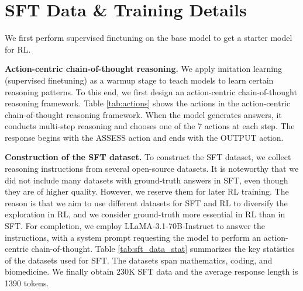 




\section{SFT Data \& Training Details}
\label{sec:sft_data_training_details}



We first perform supervised finetuning on the base model to get a starter model for RL. 

\textbf{Action-centric chain-of-thought reasoning.} We apply imitation learning (supervised finetuning) as a warmup stage to teach models to learn certain reasoning patterns. To this end, we first design an action-centric chain-of-thought reasoning framework.
Table \ref{tab:actions} shows the actions in the action-centric chain-of-thought reasoning framework. When the model generates answers, it conducts multi-step reasoning and chooses one of the 7 actions at each step. The response begins with the ASSESS action and ends with the OUTPUT action.

\textbf{Construction of the SFT dataset.} To construct the SFT dataset, we collect reasoning instructions from several open-source datasets. It is noteworthy that we did not include many datasets with ground-truth answers in SFT, even though they are of higher quality. However, we reserve them for later RL training. The reason is that we aim to use different datasets for SFT and RL to diversify the exploration in RL, and we consider ground-truth more essential in RL than in SFT.  For completion, we employ LLaMA-3.1-70B-Instruct to answer the instructions, with a system prompt requesting the model to perform an action-centric chain-of-thought. Table \ref{tab:sft_data_stat} summarizes the key statistics of the datasets used for SFT. The datasets span mathematics, coding, and biomedicine. We finally obtain 230K SFT data and the average response length is 1390 tokens.

